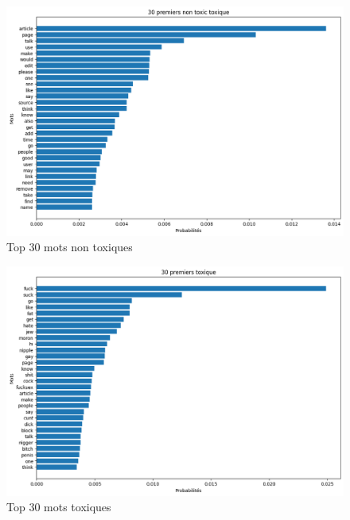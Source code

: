 \begin{figure}[htbp]
    \centering
    \includegraphics[width=.7\linewidth]{figures/30_first_non_toxic-naive_bayes.png}
    \caption{Top 30 mots non toxiques}
\end{figure}

\begin{figure}[htbp]
    \centering
    \includegraphics[width=.7\linewidth]{figures/30_first_toxic-naive_bayes.png}
    \caption{Top 30 mots toxiques}
\end{figure}